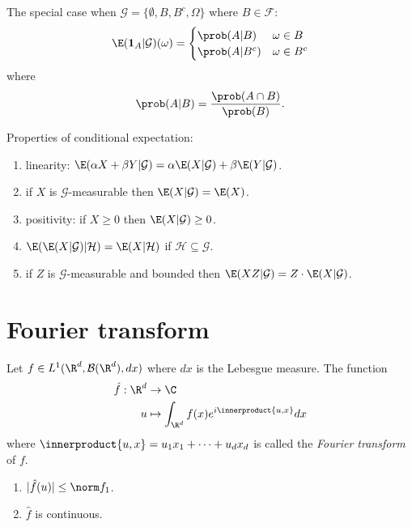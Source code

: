 \documentclass[a4paper]{article}
\renewcommand{\P}{\prob} %
\newcommand*{\ip}{\innerproduct} %
\begin{document}
\begin{remark}
  The special case when \(\mathcal G = \{\emptyset, B, B^c, \Omega\}\) where \(B \in \mathcal F\):
  \[
    \E(\mathbf 1_A | \mathcal G)(\omega) =
    \begin{cases}
      \P(A|B) & \omega \in B \\
      \P(A|B^c) & \omega \in B^c
    \end{cases}
  \]
  where
  \[
    \P(A|B) = \frac{\P(A \cap B)}{\P(B)}.
  \]
\end{remark}

\begin{proposition}
  Properties of conditional expectation:
  \begin{enumerate}
  \item linearity: \(\E(\alpha X + \beta Y | \mathcal G) = \alpha \E(X | \mathcal G) + \beta \E(Y | \mathcal G)\).
  \item if \(X\) is \(\mathcal G\)-measurable then \(\E(X | \mathcal G) = \E(X)\).
  \item positivity: if \(X \geq 0\) then \(\E(X | \mathcal G) \geq 0\).
  \item \(\E(\E(X | \mathcal G) | \mathcal H) = \E(X | \mathcal H)\) if \(\mathcal H \subseteq \mathcal G\).
  \item if \(Z\) is \(\mathcal G\)-measurable and bounded then \(\E(XZ| \mathcal G) = Z \cdot \E(X| \mathcal G)\).
  \end{enumerate}
\end{proposition}

\section{Fourier transform}

\begin{definition}
  Let \(f \in L^1(\R^d, \mathcal B(\R^d), dx)\) where \(dx\) is the Lebesgue measure. The function
  \begin{align*}
    \hat f: \R^d &\to \C \\
    u &\mapsto \int_{\R^d} f(x) e^{i \ip{u, x}} dx
  \end{align*}
  where \(\ip{u, x} = u_1x_1 + \dots + u_dx_d\) is called the \emph{Fourier transform} of \(f\).
\end{definition}

\begin{proposition}\leavevmode
  \begin{enumerate}
  \item \(|\hat f(u)| \leq \norm f_1\).
  \item \(\hat f\) is continuous. 
  \end{enumerate}
\end{proposition}
\end{document}
